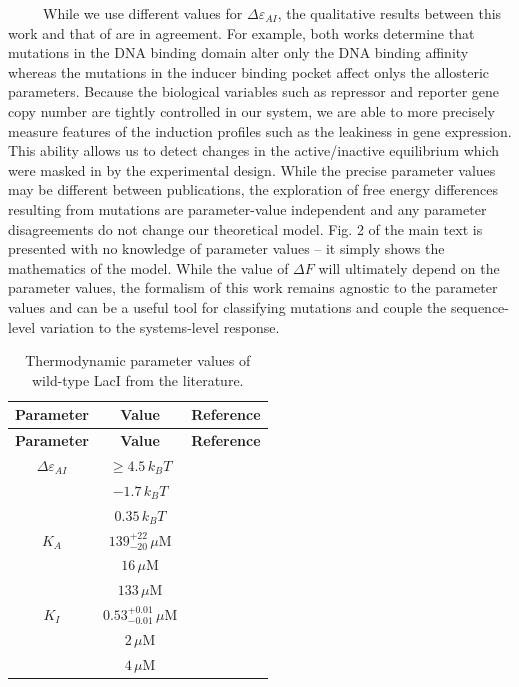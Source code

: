 \documentclass[12pt]{caltech_thesis}
\begin{document}
~~~~~While we use different values for \(\Delta\varepsilon_{AI}\), the
qualitative results between this work and that of \textcite{daber2011}
are in agreement. For example, both works determine that mutations in
the DNA binding domain alter only the DNA binding affinity whereas the
mutations in the inducer binding pocket affect onlys the allosteric
parameters. Because the biological variables such as repressor and
reporter gene copy number are tightly controlled in our system, we are
able to more precisely measure features of the induction profiles such
as the leakiness in gene expression. This ability allows us to detect
changes in the active/inactive equilibrium which were masked in
\textcite{daber2011} by the experimental design. While the precise
parameter values may be different between publications, the exploration
of free energy differences resulting from mutations are parameter-value
independent and any parameter disagreements do not change our
theoretical model. Fig. 2 of the main text is presented with no
knowledge of parameter values -- it simply shows the mathematics of the
model. While the value of \(\Delta F\) will ultimately depend on the
parameter values, the formalism of this work remains agnostic to the
parameter values and can be a useful tool for classifying mutations and
couple the sequence-level variation to the systems-level response.

\begin{longtable}[]{@{}ccc@{}}
\caption{Thermodynamic parameter values of wild-type LacI from the
literature.}\tabularnewline
\toprule()
\textbf{Parameter} & \textbf{Value} & \textbf{Reference} \\
\midrule()
\endfirsthead
\toprule()
\textbf{Parameter} & \textbf{Value} & \textbf{Reference} \\
\midrule()
\endhead
\(\Delta\varepsilon_{AI}\) & \(\geq 4.5\, k_BT\) &
\textcite{razo-mejia2018} \\
& \(-1.7\, k_BT\) & \textcite{daber2011} \\
& \(0.35\, k_BT\) & \textcite{ogorman1980} \\
\(K_A\) & \(139^{+22}_{-20}\, \mu\)M & \textcite{razo-mejia2018} \\
& \(16\,\mu\)M & \textcite{daber2011} \\
& \(133\,\mu\)M & \textcite{ogorman1980} \\
\(K_I\) & \(0.53^{+0.01}_{-0.01}\, \mu\)M & \textcite{razo-mejia2018} \\
& \(2\,\mu\)M & \textcite{daber2011} \\
& \(4\,\mu\)M & \textcite{ogorman1980} \\
\bottomrule()
\end{longtable}
\end{document}
